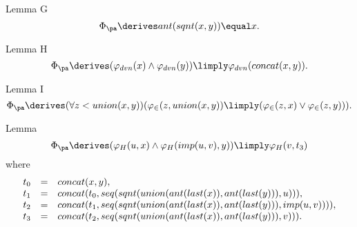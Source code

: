 \begin{theorem}{Lemma G}
\[
\Phi_\pa \derives ant(sqnt(x, y)) \equal x.
\]
\end{theorem}
\begin{theorem}{Lemma H}
\[
\Phi_\pa \derives (\varphi_{dvn}(x) \land \varphi_{dvn}(y)) \limply \varphi_{dvn}(concat(x, y)).
\]
\end{theorem}
\begin{theorem}{Lemma I}
\[
\Phi_\pa \derives (\forall z < union(x, y))(\varphi_\in(z, union(x, y)) \limply (\varphi_\in(z, x) \lor \varphi_\in(z, y))).
\]
\end{theorem}
\begin{theorem}{Lemma}
\[
\Phi_\pa \derives (\varphi_H(u, x) \land \varphi_H(imp(u, v), y)) \limply \varphi_H(v, t_3)
\]
where
\[
\begin{array}{lll}
t_0 & = & concat(x, y), \cr
t_1 & = & concat(t_0, seq(sqnt(union(ant(last(x)), ant(last(y))), u))), \cr
t_2 & = & concat(t_1, seq(sqnt(union(ant(last(x)), ant(last(y))), imp(u, v)))), \cr
t_3 & = & concat(t_2, seq(sqnt(union(ant(last(x)), ant(last(y))), v))).
\end{array}
\]
\end{theorem}
